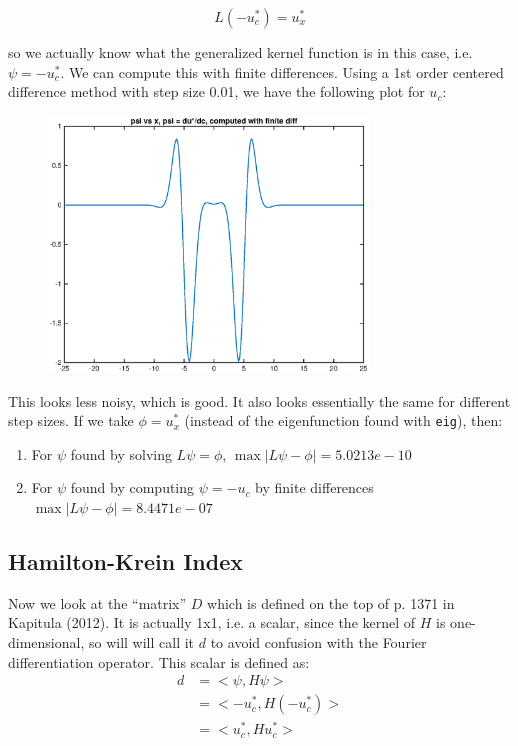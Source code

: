 \documentclass[12pt]{article}
\begin{document}
\begin{equation}
L(-u^*_c) = u^*_x
\end{equation}

so we actually know what the generalized kernel function is in this case, i.e. $\psi = -u^*_c$. We can compute this with finite differences. Using a 1st order centered difference method with step size 0.01, we have the following plot for $u_c$:

\begin{figure}[H]
	\includegraphics[width=8.5cm]{fdpsi.eps}
\end{figure}

This looks less noisy, which is good. It also looks essentially the same for different step sizes. If we take $\phi = u^*_x$ (instead of the eigenfunction found with \texttt{eig}), then:
\begin{enumerate}
	\item For $\psi$ found by solving $L \psi = \phi$, $\max{|L \psi - \phi|} = 5.0213e-10$ 
	\item For $\psi$ found by computing $\psi = -u_c$ by finite differences $\max{|L \psi - \phi|} = 8.4471e-07$
\end{enumerate}

\subsection{Hamilton-Krein Index}

Now we look at the ``matrix'' $D$ which is defined on the top of p. 1371 in Kapitula (2012). It is actually 1x1, i.e. a scalar, since the kernel of $H$ is one-dimensional, so will will call it $d$ to avoid confusion with the Fourier differentiation operator. This scalar is defined as:
\begin{align}
d &= <\psi, H \psi>\\
&= <-u^*_c, H (-u^*_c) >\\
&= <u^*_c, H u^*_c>
\end{align}
\end{document}
